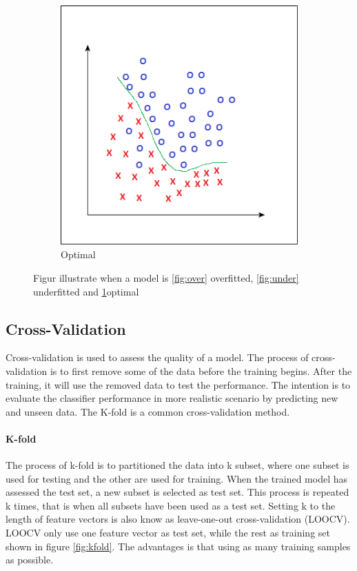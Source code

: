 \documentclass[USenglish]{ifimaster}  %
\begin{document}
\begin{figure}[h]
\begin{subfigure}{\linewidth}
			\includegraphics[scale=0.43]{Figures/Finefitting}
			\caption{Optimal}
			\label{fig:optimal}
		\end{subfigure}
		\caption{Figur illustrate when a model is \ref{fig:over} overfitted, \ref{fig:under} underfitted and \ref{fig:optimal}optimal }
		\label{fig:fitting}	
	\end{figure}
	
	\FloatBarrier
	
	\subsection{Cross-Validation}
	Cross-validation is used to assess the quality of a model. The process of cross-validation is to first remove some of the data before the training begins. After the training, it will use the removed data to test the performance. The intention is to evaluate the classifier performance in more realistic scenario by predicting new and unseen data. The K-fold is a common cross-validation method.
	
	\paragraph{K-fold}
	The process of k-fold is to partitioned the data into k subset, where one subset is used for testing and the other are used for training. When the trained model has assessed the test set, a new subset is selected as test set. This process is repeated k times, that is when all subsets have been used as a test set. Setting k to the length of feature vectors is also know as leave-one-out cross-validation (LOOCV). LOOCV only use one feature vector as test set, while the rest as training set shown in figure \ref{fig:kfold}. The advantages is that using as many training samples as possible.
	
\end{document}
